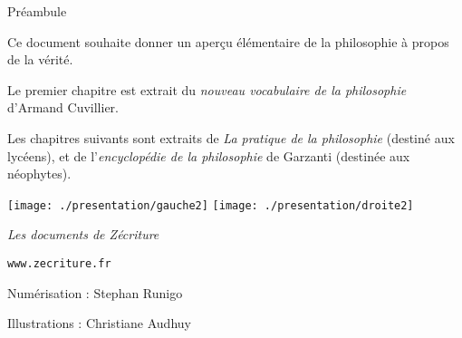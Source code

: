 
\thispagestyle{empty}

\begin{center}
\Large
Préambule
\normalsize
\end{center}
\vspace{1cm}

Ce document souhaite donner un aperçu élémentaire de la
philosophie à propos de la vérité.


Le premier chapitre est extrait du {\it nouveau vocabulaire de la philosophie} d'Armand Cuvillier.

Les chapitres suivants sont extraits de {\it La pratique de la philosophie} (destiné aux
lycéens), et de l'{\it encyclopédie de la philosophie} de Garzanti (destinée aux néophytes).

\vfill

\begin{center}
\texttt{[image: ./presentation/gauche2]}
\hspace{1cm}
\texttt{[image: ./presentation/droite2]}
\end{center}


\vfill
\vspace{1.7cm}

\hfill {\it Les documents de Zécriture}

\hfill \texttt{www.zecriture.fr}

\vspace{0.7cm}


\hfill Numérisation : Stephan Runigo

\hfill Illustrations : Christiane Audhuy

